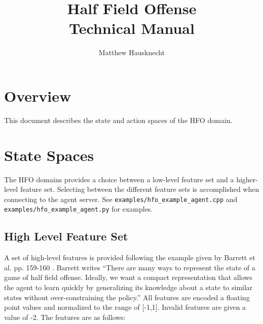 \documentclass[12pt]{article}
\title{Half Field Offense \\ Technical Manual}
\author{Matthew Hausknecht}
\begin{document}
\maketitle
\tableofcontents

\section{Overview}

This document describes the state and action spaces of the HFO domain.

\section{State Spaces}

The HFO domains provides a choice between a low-level feature set and
a higher-level feature set. Selecting between the different feature
sets is accomplished when connecting to the agent server. See
\verb|examples/hfo_example_agent.cpp| and
\verb|examples/hfo_example_agent.py| for examples.

\subsection{High Level Feature Set}
A set of high-level features is provided following the example given
by Barrett et al. pp. 159-160 \cite{THESIS14-Barrett}. Barrett writes
``There are many ways to represent the state of a game of half field
offense.  Ideally, we want a compact representation that allows the
agent to learn quickly by generalizing its knowledge about a state to
similar states without over-constraining the policy.'' All features
are encoded a floating point values and normalized to the range of
[-1,1]. Invalid features are given a value of -2. The features are as
follows:
\end{document}
